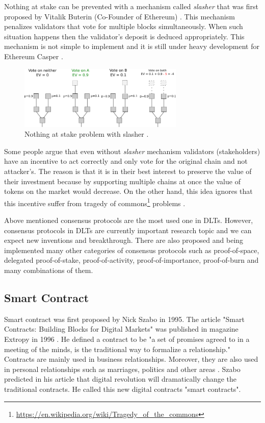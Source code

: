 Nothing at stake can be prevented with a mechanism called \textit{slasher} that was first proposed by Vitalik Buterin (Co-Founder of Ethereum) \cite{buterin_slasher:_2014}. This mechanism penalizes validators that vote for multiple blocks simultaneously. When such situation happens then the validator's deposit is deduced appropriately. This mechanism is not simple to implement and it is still under heavy development for Ethereum Casper \cite{noauthor_proof_nodate}.

\begin{figure}[ht]
	\centering
	\includegraphics[width=0.7\textwidth]{images/nothing-at-stake-slasher.png}
	\caption{\label{fig:nothing-at-stake-slasher} Nothing at stake problem with slasher \cite{noauthor_proof_nodate}.}
\end{figure}

Some people argue that even without \textit{slasher} mechanism validators (stakeholders) have an incentive to act correctly and only vote for the original chain and not attacker's. The reason is that it is in their best interest to preserve the value of their investment because by supporting multiple chains at once the value of tokens on the market would decrease. On the other hand, this idea ignores that this incentive suffer from tragedy of commons\footnote{\url{https://en.wikipedia.org/wiki/Tragedy_of_the_commons}} problems \cite{noauthor_proof_nodate}.

Above mentioned consensus protocols are the most used one in DLTs. However, consensus protocols in DLTs are currently important research topic and we can expect new inventions and breakthrough. There are also proposed and being implemented many other categories of consensus protocols such as proof-of-space, delegated proof-of-stake, proof-of-activity, proof-of-importance, proof-of-burn and many combinations of them.

\subsection{Smart Contract}
\quad Smart contract was first proposed by Nick Szabo in 1995. The article "Smart Contracts: Building Blocks for Digital Markets" was published in magazine Extropy in 1996 \cite{szabo_smart_nodate}. He defined a contract to be "a set of promises agreed to in a meeting of the minds, is the traditional way to formalize a relationship." Contracts are mainly used in business relationships. Moreover, they are also used in personal relationships such as marriages, politics and other areas \cite{szabo_smart_nodate}. Szabo predicted in his article that digital revolution will dramatically change the traditional contracts. He called this new digital contracts "smart contracts". 


